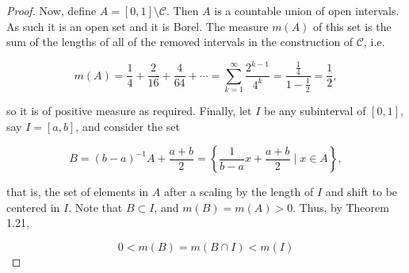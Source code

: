 \documentclass[11pt,oneside,english]{amsart}
\theoremstyle{definition}
\newcommand{\MC}[1]{\mathcal{#1}}
\begin{document}
\begin{enumerate}
\begin{proof}



Now, define $A=[0,1]\setminus \MC{C}$. Then $A$ is a countable union of open intervals. As such it is an open set and it is Borel. The measure $m(A)$ of this set is the sum of the lengths of all of the removed intervals in the construction of $\MC{C}$, i.e. 

\[
m(A)=\frac{1}{4}+\frac{2}{16}+\frac{4}{64}+\cdots=\sum_{k=1}^\infty\frac{2^{k-1}}{4^k}=\frac{\frac{1}{4}}{1-\frac{1}{2}}=\frac{1}{2},
\]

so it is of positive measure as required. Finally, let $I$ be any subinterval of $[0,1]$, say $I=[a,b]$, and consider the set 

\[
B=(b-a)^{-1}A+\frac{a+b}{2}=\left\{\frac{1}{b-a}x+\frac{a+b}{2}\mid x\in A\right\},
\]

that is, the set of elements in $A$ after a scaling by the length of $I$ and shift to be centered in $I$. Note that $B\subset I$, and $m(B)=m(A)>0$. Thus, by Theorem 1.21,

\[
0<m(B)=m(B\cap I)<m(I)
\]






\end{proof}

\end{enumerate}
\end{document}
